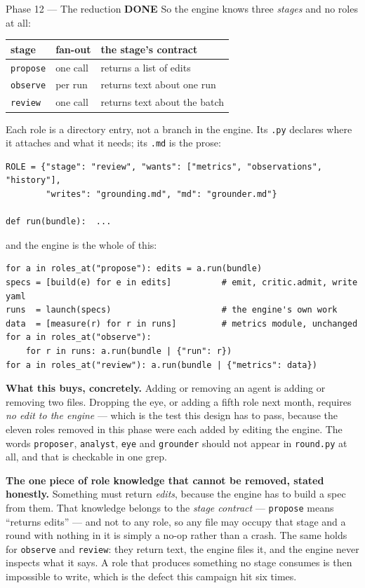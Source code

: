 \documentclass[11pt,a4paper]{article}
\newcommand{\code}[1]{\texttt{#1}}
\newcommand{\done}{\textcolor{good}{\textbf{DONE}}}
\begin{document}
\begin{phasebox}{Phase 12 --- The reduction \hfill \done}
So the engine knows three \emph{stages} and no roles at all:

\begin{center}\small
\begin{tabular}{llp{5.9cm}}
\toprule
stage & fan-out & the stage's contract \\
\midrule
\code{propose} & one call  & returns a list of edits \\
\code{observe} & per run   & returns text about one run \\
\code{review}  & one call  & returns text about the batch \\
\bottomrule
\end{tabular}
\end{center}

\noindent Each role is a directory entry, not a branch in the engine. Its \code{.py} declares where
it attaches and what it needs; its \code{.md} is the prose:

\begin{verbatim}
ROLE = {"stage": "review", "wants": ["metrics", "observations", "history"],
        "writes": "grounding.md", "md": "grounder.md"}

def run(bundle):  ...
\end{verbatim}

\noindent and the engine is the whole of this:

\begin{verbatim}
for a in roles_at("propose"): edits = a.run(bundle)
specs = [build(e) for e in edits]          # emit, critic.admit, write yaml
runs  = launch(specs)                      # the engine's own work
data  = [measure(r) for r in runs]         # metrics module, unchanged
for a in roles_at("observe"):
    for r in runs: a.run(bundle | {"run": r})
for a in roles_at("review"): a.run(bundle | {"metrics": data})
\end{verbatim}

\textbf{What this buys, concretely.} Adding or removing an agent is adding or removing two files.
Dropping the eye, or adding a fifth role next month, requires \emph{no edit to the engine} --- which
is the test this design has to pass, because the eleven roles removed in this phase were each added
by editing the engine. The words \code{proposer}, \code{analyst}, \code{eye} and \code{grounder}
should not appear in \code{round.py} at all, and that is checkable in one grep.

\textbf{The one piece of role knowledge that cannot be removed, stated honestly.} Something must
return \emph{edits}, because the engine has to build a spec from them. That knowledge belongs to the
\emph{stage contract} --- \code{propose} means ``returns edits'' --- and not to any role, so any file
may occupy that stage and a round with nothing in it is simply a no-op rather than a crash. The same
holds for \code{observe} and \code{review}: they return text, the engine files it, and the engine
never inspects what it says. A role that produces something no stage consumes is then impossible to
write, which is the defect this campaign hit six times.


\end{phasebox}
\end{document}

